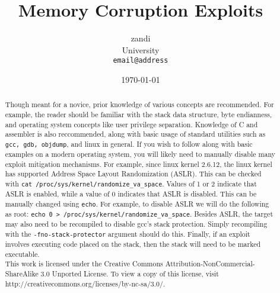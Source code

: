 \documentclass[a4paper]{article}
\begin{document}
\title{Memory Corruption Exploits}
\author{zandi\\
	University\\
	\texttt{email@address}}
\date{\today}
\maketitle

\begin{abstract}
Though meant for a novice, prior knowledge of various concepts are recommended. For example,
the reader should be familiar with the stack data structure, byte endianness, and operating system
concepts like user privilege separation. Knowledge of C and assembler is also reccommended, along
with basic usage of standard utilities such as \texttt{gcc, gdb, objdump}, and linux in general.
If you wish to follow along with basic examples on a modern operating system, you will likely
need to manually disable many exploit mitigation mechanisms. For example, since linux kernel
2.6.12, the linux kernel has supported Address Space Layout Randomization (ASLR). This can be
checked with \texttt{cat /proc/sys/kernel/randomize\_va\_space}. Values of 1 or 2 indicate that
ASLR is enabled, while a value of 0 indicates that ASLR is disabled. This can be manually
changed using \texttt{echo}. For example, to disable ASLR we will do the following as root:
\texttt{echo 0 > /proc/sys/kernel/randomize\_va\_space}. Besides ASLR, the target may also need to
be recompiled to disable gcc's stack protection. Simply recompiling with the \texttt{-fno-stack-protector}
argument should do this. Finally, if an exploit involves executing code placed on the stack, then
the stack will need to be marked executable.\\

This work is licensed under the Creative Commons Attribution-NonCommercial-ShareAlike 3.0 Unported License.
To view a copy of this license, visit http://creativecommons.org/licenses/by-nc-sa/3.0/.

\end{abstract}




\end{document}
